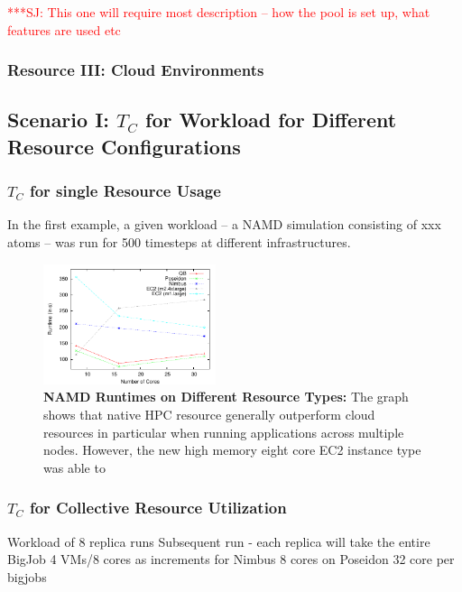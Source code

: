 \documentclass[conference,final]{IEEEtran}
\newcommand{\tc}{$T_{C}$ }
\newcommand{\jhanote}[1]{ {\textcolor{red} { ***SJ: #1 }}}
\newcommand{\jhanote}[1]{}
\begin{document}
\jhanote{This one will require most description -- how the pool is set
up, what features are used etc}

\subsubsection*{Resource III: Cloud Environments}


\subsection{Scenario I: \tc for Workload for Different Resource Configurations}

\subsubsection{\tc for single Resource Usage}

In the first example, a given workload -- a NAMD simulation consisting of xxx atoms --
was run for 500 timesteps at different infrastructures.

\begin{figure}[htbp]
    \centering
        \includegraphics[width=0.45\textwidth]{performance/namd_run.pdf}
    \caption{\textbf{NAMD Runtimes on Different Resource Types: } The graph shows that 
             native HPC resource generally outperform cloud resources in particular when
             running applications across multiple nodes. However, the new 
             high memory eight core EC2 instance type was able to }
    \label{fig:performance_namd_run}
\end{figure}




\subsubsection{\tc for Collective Resource Utilization}

Workload of 8 replica runs
Subsequent run - each replica will take the entire BigJob
4 VMs/8 cores as increments for Nimbus
8 cores on Poseidon
32 core per bigjobs
\end{document}
